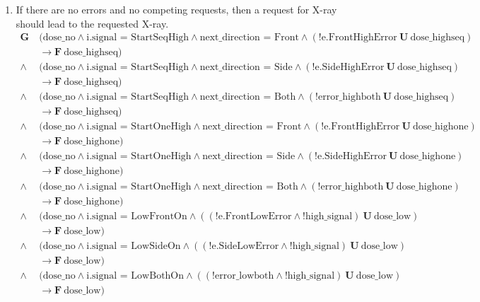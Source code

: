 \documentclass[a4paper,10pt]{article}
\newcommand{\LTLG}{\mathbf{G~}}
\newcommand{\LTLF}{\mathbf{F~}}
\newcommand{\LTLU}{\mathbf{~U~}}
\newcommand{\imply}{\rightarrow}
\newcommand{\doselow}{\textrm{dose\_low}}
\newcommand{\doseno}{\textrm{dose\_no}}
\newcommand{\dosehighseq}{\textrm{dose\_highseq}}
\newcommand{\dosehighone}{\textrm{dose\_highone}}
\newcommand{\highsignal}{\textrm{high\_signal}}
\begin{document}
\begin{enumerate}
		\item If there are no errors and no competing requests, then a request for X-ray should lead to the requested X-ray.
			\begin{align*}
				\LTLG & (\doseno \land \textrm{i.signal = StartSeqHigh} \land \textrm{next\_direction = Front} \land (!\textrm{e.FrontHighError} \LTLU \dosehighseq) \\
					& \imply \LTLF \dosehighseq) \\
				\land & (\doseno \land \textrm{i.signal = StartSeqHigh} \land \textrm{next\_direction = Side} \land (!\textrm{e.SideHighError} \LTLU \dosehighseq) \\
					& \imply \LTLF \dosehighseq) \\
				\land & (\doseno \land \textrm{i.signal = StartSeqHigh} \land \textrm{next\_direction = Both} \land (!\textrm{error\_highboth} \LTLU \dosehighseq) \\
					& \imply \LTLF \dosehighseq) \\
				\land & (\doseno \land \textrm{i.signal = StartOneHigh} \land \textrm{next\_direction = Front} \land (!\textrm{e.FrontHighError} \LTLU \dosehighone) \\
					& \imply \LTLF \dosehighone) \\
				\land & (\doseno \land \textrm{i.signal = StartOneHigh} \land \textrm{next\_direction = Side} \land (!\textrm{e.SideHighError} \LTLU \dosehighone) \\
					& \imply \LTLF \dosehighone) \\
				\land & (\doseno \land \textrm{i.signal = StartOneHigh} \land \textrm{next\_direction = Both} \land (!\textrm{error\_highboth} \LTLU \dosehighone) \\
					& \imply \LTLF \dosehighone) \\
				\land & (\doseno \land \textrm{i.signal = LowFrontOn} \land ((!\textrm{e.FrontLowError} \land !\highsignal) \LTLU \doselow) \\
					& \imply \LTLF \doselow) \\
				\land & (\doseno \land \textrm{i.signal = LowSideOn} \land ((!\textrm{e.SideLowError} \land !\highsignal) \LTLU \doselow) \\
					& \imply \LTLF \doselow) \\
				\land & (\doseno \land \textrm{i.signal = LowBothOn} \land ((!\textrm{error\_lowboth} \land !\highsignal) \LTLU \doselow) \\
					& \imply \LTLF \doselow)
			\end{align*}


\end{enumerate}
\end{document}
